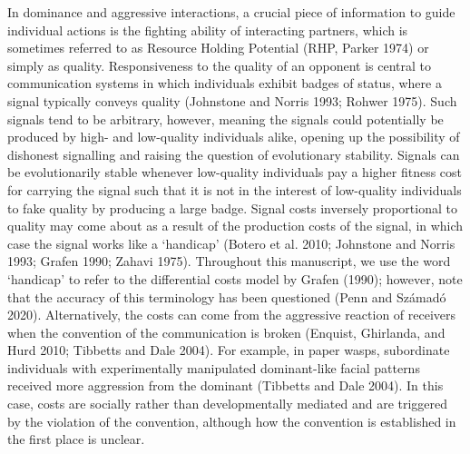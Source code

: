 \documentclass[
  12pt,
]{article}
\begin{document}
In dominance and aggressive interactions, a crucial piece of information
to guide individual actions is the fighting ability of interacting
partners, which is sometimes referred to as Resource Holding Potential
(RHP, Parker 1974) or simply as quality. Responsiveness to the quality
of an opponent is central to communication systems in which individuals
exhibit badges of status, where a signal typically conveys quality
(Johnstone and Norris 1993; Rohwer 1975). Such signals tend to be
arbitrary, however, meaning the signals could potentially be produced by
high- and low-quality individuals alike, opening up the possibility of
dishonest signalling and raising the question of evolutionary stability.
Signals can be evolutionarily stable whenever low-quality individuals
pay a higher fitness cost for carrying the signal such that it is not in
the interest of low-quality individuals to fake quality by producing a
large badge. Signal costs inversely proportional to quality may come
about as a result of the production costs of the signal, in which case
the signal works like a `handicap' (Botero et al. 2010; Johnstone and
Norris 1993; Grafen 1990; Zahavi 1975). Throughout this manuscript, we
use the word `handicap' to refer to the differential costs model by
Grafen (1990); however, note that the accuracy of this terminology has
been questioned (Penn and Számadó 2020). Alternatively, the costs can
come from the aggressive reaction of receivers when the convention of
the communication is broken (Enquist, Ghirlanda, and Hurd 2010; Tibbetts
and Dale 2004). For example, in paper wasps, subordinate individuals
with experimentally manipulated dominant-like facial patterns received
more aggression from the dominant (Tibbetts and Dale 2004). In this
case, costs are socially rather than developmentally mediated and are
triggered by the violation of the convention, although how the
convention is established in the first place is unclear.
\end{document}
